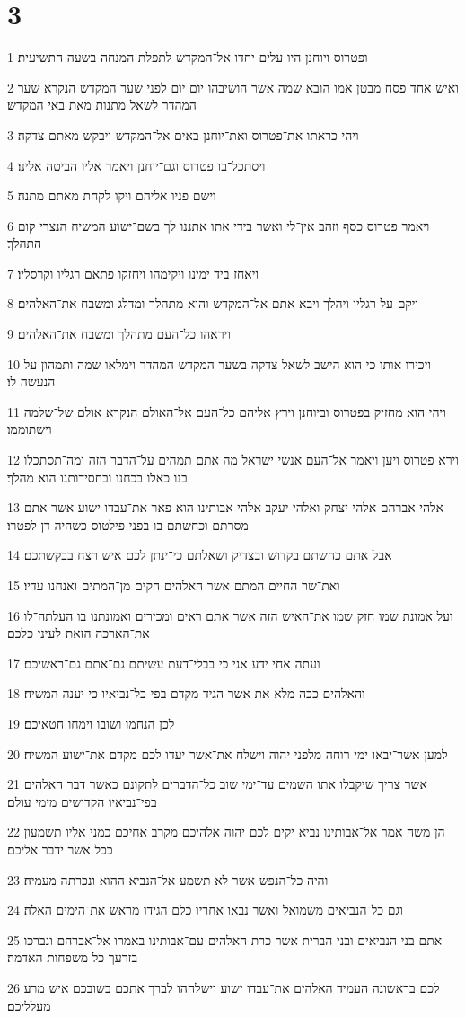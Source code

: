 \chapter{3}

\par 1 ופטרוס ויוחנן היו עלים יחדו אל־המקדש לתפלת המנחה בשעה התשיעית׃
\par 2 ואיש אחד פסח מבטן אמו הובא שמה אשר הושיבהו יום יום לפני שער המקדש הנקרא שער המהדר לשאל מתנות מאת באי המקדש׃
\par 3 ויהי כראתו את־פטרוס ואת־יוחנן באים אל־המקדש ויבקש מאתם צדקה׃
\par 4 ויסתכל־בו פטרוס וגם־יוחנן ויאמר אליו הביטה אלינו׃
\par 5 וישם פניו אליהם ויקו לקחת מאתם מתנה׃
\par 6 ויאמר פטרוס כסף וזהב אין־לי ואשר בידי אתו אתננו לך בשם־ישוע המשיח הנצרי קום התהלך׃
\par 7 ויאחז ביד ימינו ויקימהו ויחזקו פתאם רגליו וקרסליו׃
\par 8 ויקם על רגליו ויהלך ויבא אתם אל־המקדש והוא מתהלך ומדלג ומשבח את־האלהים׃
\par 9 ויראהו כל־העם מתהלך ומשבח את־האלהים׃
\par 10 ויכירו אותו כי הוא הישב לשאל צדקה בשער המקדש המהדר וימלאו שמה ותמהון על הנעשה לו׃
\par 11 ויהי הוא מחזיק בפטרוס וביוחנן וירץ אליהם כל־העם אל־האולם הנקרא אולם של־שלמה וישתוממו׃
\par 12 וירא פטרוס ויען ויאמר אל־העם אנשי ישראל מה אתם תמהים על־הדבר הזה ומה־תסתכלו בנו כאלו בכחנו ובחסידותנו הוא מהלך׃
\par 13 אלהי אברהם אלהי יצחק ואלהי יעקב אלהי אבותינו הוא פאר את־עבדו ישוע אשר אתם מסרתם וכחשתם בו בפני פילטוס כשהיה דן לפטרו׃
\par 14 אבל אתם כחשתם בקדוש ובצדיק ושאלתם כי־ינתן לכם איש רצח בבקשתכם׃
\par 15 ואת־שר החיים המתם אשר האלהים הקים מן־המתים ואנחנו עדיו׃
\par 16 ועל אמונת שמו חזק שמו את־האיש הזה אשר אתם ראים ומכירים ואמונתנו בו העלתה־לו את־הארכה הזאת לעיני כלכם׃
\par 17 ועתה אחי ידע אני כי בבלי־דעת עשיתם גם־אתם גם־ראשיכם׃
\par 18 והאלהים ככה מלא את אשר הגיד מקדם בפי כל־נביאיו כי יענה המשיח׃
\par 19 לכן הנחמו ושובו וימחו חטאיכם׃
\par 20 למען אשר־יבאו ימי רוחה מלפני יהוה וישלח את־אשר יעדו לכם מקדם את־ישוע המשיח׃
\par 21 אשר צריך שיקבלו אתו השמים עד־ימי שוב כל־הדברים לתקונם כאשר דבר האלהים בפי־נביאיו הקדושים מימי עולם׃
\par 22 הן משה אמר אל־אבותינו נביא יקים לכם יהוה אלהיכם מקרב אחיכם כמני אליו תשמעון ככל אשר ידבר אליכם׃
\par 23 והיה כל־הנפש אשר לא תשמע אל־הנביא ההוא ונכרתה מעמיה׃
\par 24 וגם כל־הנביאים משמואל ואשר נבאו אחריו כלם הגידו מראש את־הימים האלה׃
\par 25 אתם בני הנביאים ובני הברית אשר כרת האלהים עם־אבותינו באמרו אל־אברהם ונברכו בזרעך כל משפחות האדמה׃
\par 26 לכם בראשונה העמיד האלהים את־עבדו ישוע וישלחהו לברך אתכם בשובכם איש מרע מעלליכם׃

